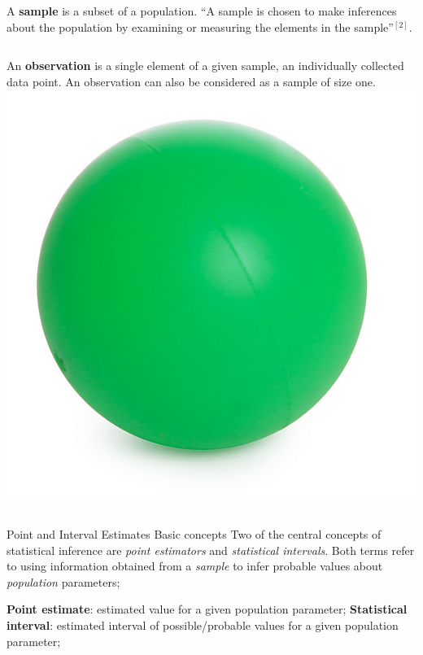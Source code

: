 \documentclass[t]{beamer}
\begin{document}
\begin{ftst}
\begin{columns}
\vhalf
A \textbf{sample} is a subset of a population. ``A sample is chosen to make inferences about the population by examining or measuring the elements in the sample''$^{[2]}$.
\end{columns}
\vone\vhalf
\begin{columns}
\vhalf
An \textbf{observation} is a single element of a given sample, an individually collected data point. An observation can also be considered as a sample of size one.
\includegraphics[width=\textwidth]{../figs/greenball.png}
\end{columns}
\end{ftst}


\begin{ftst}
{Point and Interval Estimates}
{Basic concepts}
Two of the central concepts of statistical inference are \textit{point estimators} and \textit{statistical intervals}.
\vone
Both terms refer to using information obtained from a \textit{sample} to infer probable values about \textit{population} parameters;

\bitems \textbf{Point estimate}: estimated value for a given population parameter;
	\spitem \textbf{Statistical interval}: estimated interval of possible/probable values for a given population parameter; 
\eitem
\end{ftst}
\end{document}
